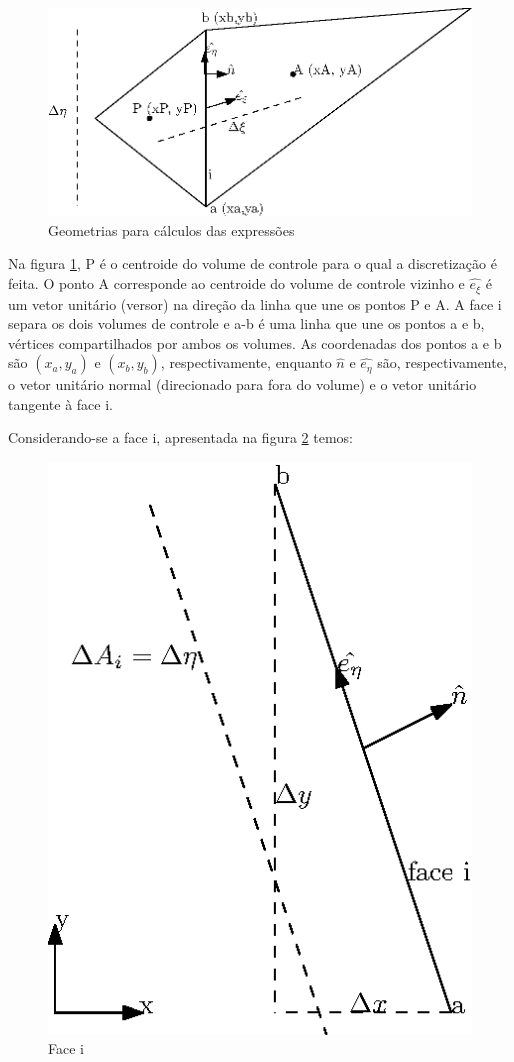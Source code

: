 \begin{figure}[h]
    \centering
    \includegraphics{fig/geometrias.eps}
    \caption{Geometrias para cálculos das expressões}
    \label{fig:geometrias}
\end{figure}

Na figura \ref{fig:geometrias}, P é o centroide do volume de controle para o qual a discretização é feita. O ponto A corresponde ao centroide do volume de controle vizinho e $\hat{e_\xi}$ é um vetor unitário (versor) na direção da linha que une os pontos P e A. A face i separa os dois volumes de controle e a-b é uma linha que une os pontos a e b, vértices compartilhados por ambos os volumes. As coordenadas dos pontos a e b são $(x_a, y_a)$ e $(x_b, y_b)$, respectivamente, enquanto $\hat{n}$ e $\hat{e_\eta}$ são, respectivamente, o vetor unitário normal (direcionado para fora do volume) e o vetor unitário tangente à face i.

Considerando-se a face i, apresentada na figura \ref{face-i} temos:

\begin{figure}[h]
    \centering
    \includegraphics{fig/face-i.eps}
    \caption{Face i}
    \label{face-i}
\end{figure}

